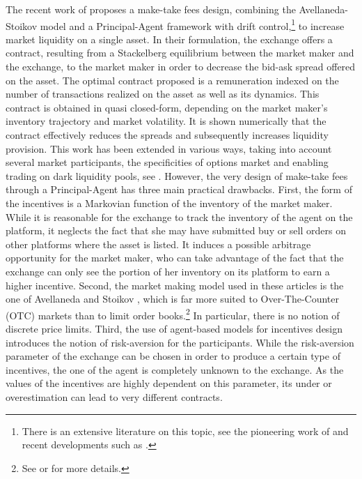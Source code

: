 \documentclass[11pt]{article}
\begin{document}
The recent work of \cite{el2018optimal} proposes a make-take fees design, combining the Avellaneda-Stoikov \cite{avellaneda2008high} model and a Principal-Agent framework with drift control,\footnote{There is an extensive literature on this topic, see the pioneering work of \cite{sannikov2008continuous} and recent developments such as  \cite{elie2019contracting,elie2019tale}.} to increase market liquidity on a single asset. In their formulation, the exchange offers a contract, resulting from a Stackelberg equilibrium between the market maker and the exchange, to the market maker in order to decrease the bid-ask spread offered on the asset. The optimal contract proposed is a remuneration indexed on the number of transactions realized on the asset as well as its dynamics. This contract is obtained in quasi closed-form, depending on the market maker’s inventory trajectory and market volatility. It is shown numerically that the contract effectively reduces the spreads and subsequently increases liquidity provision. This work has been extended in various ways, taking into account several market participants, the specificities of options market and enabling trading on dark liquidity pools, see \cite{baldacci2019market,baldacci2019optimal,baldacci2019design}. However, the very design of make-take fees through a Principal-Agent has three main practical drawbacks. First, the form of the incentives is a Markovian function of the inventory of the market maker. While it is reasonable for the exchange to track the inventory of the agent on the platform, it neglects the fact that she may have submitted buy or sell orders on other platforms where the asset is listed. It induces a possible arbitrage opportunity for the market maker, who can take advantage of the fact that the exchange can only see the portion of her inventory on its platform to earn a higher incentive. Second, the market making model used in these articles is the one of Avellaneda and Stoikov \cite{avellaneda2008high}, which is far more suited to Over-The-Counter (OTC) markets than to limit order books.\footnote{See \cite{bergault2021size} or \cite{gueant2016financial} for more details.} In particular, there is no notion of discrete price limits. Third, the use of agent-based models for incentives design introduces the notion of risk-aversion for the participants. While the risk-aversion parameter of the exchange can be chosen in order to produce a certain type of incentives, the one of the agent is completely unknown to the exchange. As the values of the incentives are highly dependent on this parameter, its under or overestimation can lead to very different contracts.\\ 
\end{document}
